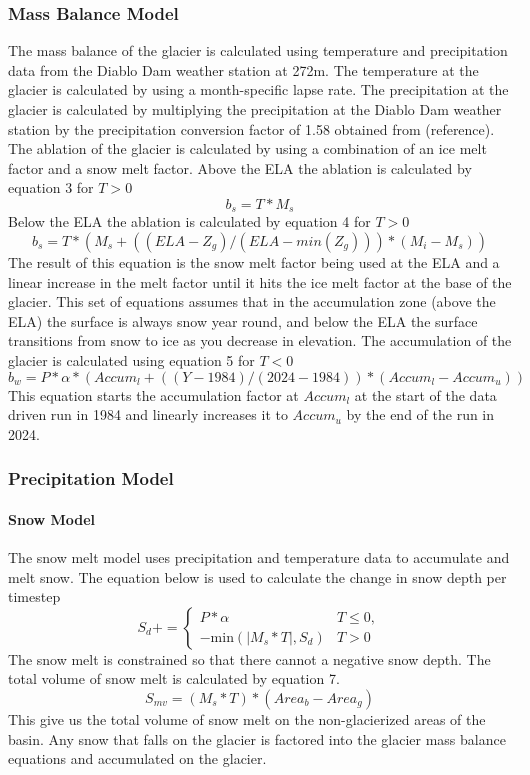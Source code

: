 \documentclass{article}
\begin{document}
\subsubsection{Mass Balance Model}
The mass balance of the glacier is calculated using temperature and precipitation data from the Diablo Dam weather station at 272m. The 
temperature at the glacier is calculated by using a month-specific lapse rate. 
The precipitation at the glacier is calculated by multiplying the precipitation at the Diablo Dam weather station by the precipitation conversion factor of 1.58 
obtained from (reference). The ablation of the glacier is calculated by using a combination of an ice melt factor and a snow melt factor. Above the ELA the 
ablation is calculated by equation 3 for $T>0$
\begin{equation}b_s=T*M_{s}\end{equation}
Below the ELA the ablation is calculated by equation 4 for $T>0$
\begin{equation}b_s=T*(M_{s}+((ELA-Z_g)/(ELA-min(Z_g)))*(M_{i}-M_{s}))\end{equation}
The result of this equation is the snow melt factor being used at the ELA and a linear increase in the melt factor until it hits the ice melt 
factor at the base of the glacier. This set of equations assumes that in the accumulation zone (above the ELA) the surface is always snow year 
round, and below the ELA the surface transitions from snow to ice as you decrease in elevation.
The accumulation of the glacier is calculated using equation 5 for $T<0$
\begin{equation}b_w=P*\alpha*({Accum}_{l}+((Y-1984)/(2024-1984))*({Accum}_{l}-{Accum}_{u}))\end{equation}
This equation starts the accumulation factor at ${Accum}_{l}$ at the start of the data driven run in 1984 and linearly increases it to $Accum_{u}$ by the end 
of the run in 2024.

\subsubsection{Precipitation Model}
\paragraph{Snow Model}
The snow melt model uses precipitation and temperature data to accumulate and melt snow. 
The equation below is used to calculate the change in snow depth per timestep 
\begin{equation}S_{d} += 
\begin{cases} 
  P*\alpha & T \leq 0,\\
  -\text{min}(|M_{s}*T|,S_{d}) &  T > 0
\end{cases}\end{equation}
The snow melt is constrained so that there cannot a negative snow depth. 
The total volume of snow melt is calculated by equation 7.
\begin{equation}S_{mv}=(M_{s}*T)*({Area}_{b}-{Area}_{g})\end{equation}
This give us the total volume of snow melt on the non-glacierized areas of the basin. Any snow that falls on the glacier is factored into 
the glacier mass balance equations and accumulated on the glacier.
\end{document}
